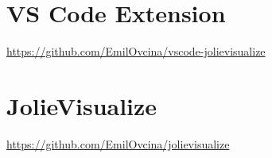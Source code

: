 
\section{VS Code Extension}
\url{https://github.com/EmilOvcina/vscode-jolievisualize}

\section{JolieVisualize}
\url{https://github.com/EmilOvcina/jolievisualize}